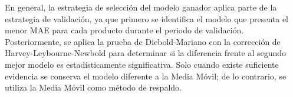 En general, la estrategia de selección del modelo ganador aplica parte de la estrategia de validación, ya que primero se identifica el modelo que presenta el menor MAE para cada producto durante el periodo de validación. Posteriormente, se aplica la prueba de Diebold-Mariano con la corrección de Harvey-Leybourne-Newbold para determinar si la diferencia frente al segundo mejor modelo es estadísticamente significativa. Solo cuando existe suficiente evidencia se conserva el modelo diferente a la Media Móvil; de lo contrario, se utiliza la Media Móvil como método de respaldo.